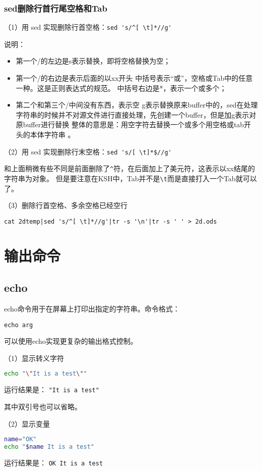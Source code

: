 \subsubsection{sed删除行首行尾空格和Tab}
（1）用 sed 实现删除行首空格：\verb|sed 's/^[ \t]*//g'|

说明： 
\begin{itemize}
\item 第一个/的左边是s表示替换，即将空格替换为空；
\item 第一个/的右边是表示后面的以xx开头 中括号表示“或”，空格或Tab中的任意一种。这是正则表达式的规范。 中括号右边是*，表示一个或多个；
\item 第二个和第三个/中间没有东西，表示空 g表示替换原来buffer中的，sed在处理字符串的时候并不对源文件进行直接处理，先创建一个buffer，但是加g表示对原buffer进行替换 整体的意思是：用空字符去替换一个或多个用空格或tab开头的本体字符串 。
\end{itemize}

（2）用 sed 实现删除行末空格：\verb|sed 's/[ \t]*$//g' |

和上面稍微有些不同是前面删除了\verb|^|符，在后面加上了美元符，这表示以xx结尾的字符串为对象。 
但是要注意在KSH中，Tab并不是\verb|\t|而是直接打入一个Tab就可以了。

（3）删除行首空格、多余空格已经空行

\verb!cat 2dtemp|sed 's/^[ \t]*//g'|tr -s '\n'|tr -s ' ' > 2d.ods!


\section{输出命令}
\subsection{echo}
echo命令用于在屏幕上打印出指定的字符串。命令格式：

\verb|echo arg|

可以使用echo实现更复杂的输出格式控制。

（1）显示转义字符
\begin{lstlisting}[language=sh]
echo "\"It is a test\""
\end{lstlisting}
运行结果是：
\verb|"It is a test"|

其中双引号也可以省略。

（2）显示变量
\begin{lstlisting}[language=sh]
name="OK"
echo "$name It is a test"
\end{lstlisting}
运行结果是：
\verb|OK It is a test|

